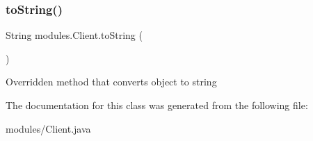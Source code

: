 \subsubsection{\texorpdfstring{to\+String()}{toString()}}
{\footnotesize\ttfamily String modules.\+Client.\+to\+String (\begin{DoxyParamCaption}{ }\end{DoxyParamCaption})\hspace{0.3cm}{\ttfamily [inline]}}

Overridden method that converts object to string 

The documentation for this class was generated from the following file\+:\begin{DoxyCompactItemize}
\item 
modules/Client.\+java\end{DoxyCompactItemize}
